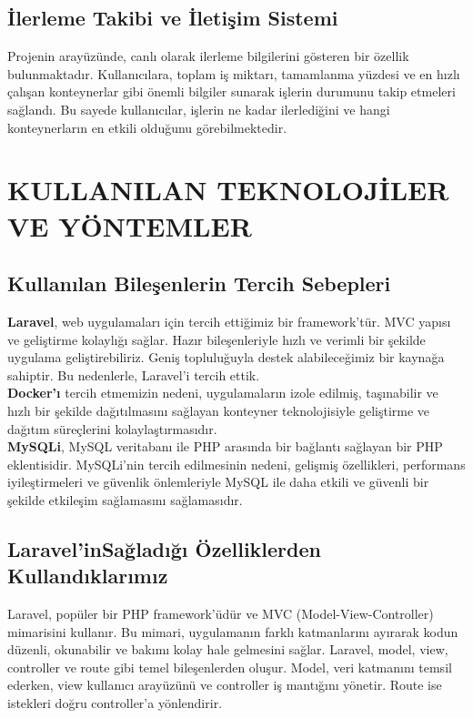 \subsection{İlerleme Takibi ve İletişim Sistemi}
Projenin arayüzünde, canlı olarak ilerleme bilgilerini gösteren bir özellik bulunmaktadır. Kullanıcılara, toplam iş miktarı, tamamlanma yüzdesi ve en hızlı çalışan konteynerlar gibi önemli bilgiler sunarak işlerin durumunu takip etmeleri sağlandı. Bu sayede kullanıcılar, işlerin ne kadar ilerlediğini ve hangi konteynerların en etkili olduğunu görebilmektedir.
\section{KULLANILAN TEKNOLOJİLER VE YÖNTEMLER}
\subsection{Kullanılan Bileşenlerin Tercih Sebepleri}
\textbf{Laravel}, web uygulamaları için tercih ettiğimiz bir framework'tür. MVC yapısı ve geliştirme kolaylığı sağlar. Hazır bileşenleriyle hızlı ve verimli bir şekilde uygulama geliştirebiliriz. Geniş topluluğuyla destek alabileceğimiz bir kaynağa sahiptir. Bu nedenlerle, Laravel'i tercih ettik.\\
\textbf{Docker'ı} tercih etmemizin nedeni, uygulamaların izole edilmiş, taşınabilir ve hızlı bir şekilde dağıtılmasını sağlayan konteyner teknolojisiyle geliştirme ve dağıtım süreçlerini kolaylaştırmasıdır.\\
\textbf{MySQLi}, MySQL veritabanı ile PHP arasında bir bağlantı sağlayan bir PHP eklentisidir. MySQLi'nin tercih edilmesinin nedeni, gelişmiş özellikleri, performans iyileştirmeleri ve güvenlik önlemleriyle MySQL ile daha etkili ve güvenli bir şekilde etkileşim sağlamasını sağlamasıdır.
\subsection{ \textbf{Laravel'in}Sağladığı Özelliklerden Kullandıklarımız}
Laravel, popüler bir PHP framework'üdür ve MVC (Model-View-Controller) mimarisini kullanır. Bu mimari, uygulamanın farklı katmanlarını ayırarak kodun düzenli, okunabilir ve bakımı kolay hale gelmesini sağlar. Laravel, model, view, controller ve route gibi temel bileşenlerden oluşur. Model, veri katmanını temsil ederken, view kullanıcı arayüzünü ve controller iş mantığını yönetir. Route ise istekleri doğru controller'a yönlendirir.\\

